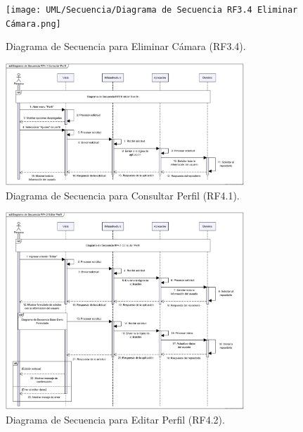 \begin{figure}[H]
	\centering
		\caption{Diagrama de Secuencia para Eliminar Cámara (RF3.4).}
	\texttt{[image: UML/Secuencia/Diagrama de Secuencia RF3.4 Eliminar Cámara.png]}
\end{figure}


\begin{figure}[H]
	\centering
	\caption{Diagrama de Secuencia para Consultar Perfil (RF4.1).}
 \includegraphics[width=0.8\textwidth]{UML/Secuencia/Diagrama de Secuencia RF4.1 Consultar Perfil.png}
\end{figure}


\begin{figure}[H]
	\centering
		\caption{Diagrama de Secuencia para Editar Perfil (RF4.2).}
	\includegraphics[width=0.8\textwidth]{UML/Secuencia/Diagrama de Secuencia RF4.2 Editar Perfil.png}
\end{figure}


